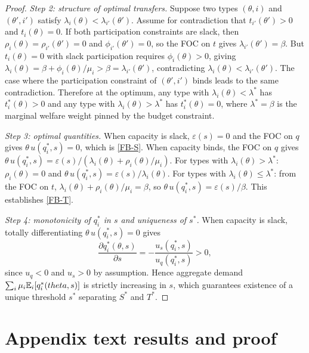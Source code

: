 \documentclass[master.tex]{subfiles}
\begin{document}
\begin{proof}
\textit{Step 2: structure of optimal transfers.} Suppose two types $(\theta,i)$ and $(\theta',i')$ satisfy $\lambda_i(\theta) < \lambda_{i'}(\theta')$. Assume for contradiction that $t_{i'}(\theta') > 0$ and $t_i(\theta) = 0$. If both participation constraints are slack, then $\rho_i(\theta) = \rho_{i'}(\theta') = 0$ and $\phi_{i'}(\theta') = 0$, so the FOC on $t$ gives $\lambda_{i'}(\theta') = \beta$. But $t_i(\theta) = 0$ with slack participation requires $\phi_i(\theta) > 0$, giving $\lambda_i(\theta) = \beta + \phi_i(\theta)/\mu_i > \beta = \lambda_{i'}(\theta')$, contradicting $\lambda_i(\theta) < \lambda_{i'}(\theta')$. The case where the participation constraint of $(\theta', i')$ binds leads to the same contradiction. Therefore at the optimum, any type with $\lambda_i(\theta) < \lambda^*$ has $t_i^*(\theta) > 0$ and any type with $\lambda_i(\theta) > \lambda^*$ has $t_i^*(\theta) = 0$, where $\lambda^* = \beta$ is the marginal welfare weight pinned by the budget constraint.

\textit{Step 3: optimal quantities.} When capacity is slack, $\varepsilon(s) = 0$ and the FOC on $q$ gives $\theta\, u(q_i^*,s) = 0$, which is \eqref{FB-S}. When capacity binds, the FOC on $q$ gives $\theta\, u(q_i^*,s) = \varepsilon(s)/(\lambda_i(\theta) + \rho_i(\theta)/\mu_i)$. For types with $\lambda_i(\theta) > \lambda^*$: $\rho_i(\theta) = 0$ and $\theta\, u(q_i^*,s) = \varepsilon(s)/\lambda_i(\theta)$. For types with $\lambda_i(\theta) \leq \lambda^*$: from the FOC on $t$, $\lambda_i(\theta) + \rho_i(\theta)/\mu_i = \beta$, so $\theta\, u(q_i^*,s) = \varepsilon(s)/\beta$. This establishes \eqref{FB-T}.

\textit{Step 4: monotonicity of $q_i^*$ in $s$ and uniqueness of $s^*$.} When capacity is slack, totally differentiating $\theta\, u(q_i^*,s) = 0$ gives
\[
\frac{\partial q_i^*(\theta,s)}{\partial s} = -\frac{u_s(q_i^*,s)}{u_q(q_i^*,s)} > 0,
\]
since $u_q < 0$ and $u_s > 0$ by assumption. Hence aggregate demand $\sum_i \mu_i \mathbb{E}_i[q_i^*(theta,s)]$ is strictly increasing in $s$, which guarantees existence of a unique threshold $s^*$ separating $S^*$ and $T^*$.
\end{proof}



\section{Appendix text results and proof}


\end{document}
